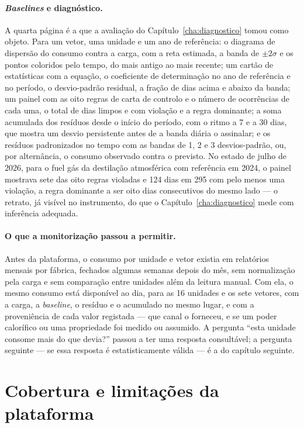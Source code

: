 \paragraph{\emph{Baselines} e diagnóstico.} A quarta página é a que a
avaliação do Capítulo~\ref{cha:diagnostico} tomou como objeto. Para um
vetor, uma unidade e um ano de referência: o diagrama de dispersão do
consumo contra a carga, com a reta estimada, a banda de $\pm2\sigma$ e os
pontos coloridos pelo tempo, do mais antigo ao mais recente; um cartão de
estatísticas com a equação, o coeficiente de determinação no ano de
referência e no período, o desvio-padrão residual, a fração de dias acima
e abaixo da banda; um painel com as oito regras de carta de controlo e o
número de ocorrências de cada uma, o total de dias limpos e com violação e
a regra dominante; a soma acumulada dos resíduos desde o início do
período, com o ritmo a 7 e a 30 dias, que mostra um desvio persistente
antes de a banda diária o assinalar; e os resíduos padronizados no tempo
com as bandas de 1, 2 e 3 desvios-padrão, ou, por alternância, o consumo
observado contra o previsto. No estado de julho de 2026, para o fuel gás
da destilação atmosférica com referência em 2024, o painel mostrava sete
das oito regras violadas e 124 dias em 295 com pelo menos uma violação, a
regra dominante a ser oito dias consecutivos do mesmo lado --- o retrato,
já visível no instrumento, do que o Capítulo~\ref{cha:diagnostico} mede
com inferência adequada.

\paragraph{O que a monitorização passou a permitir.} Antes da plataforma,
o consumo por unidade e vetor existia em relatórios mensais por fábrica,
fechados algumas semanas depois do mês, sem normalização pela carga e sem
comparação entre unidades além da leitura manual. Com ela, o mesmo consumo
está disponível ao dia, para as 16 unidades e os sete vetores, com a
carga, a \emph{baseline}, o resíduo e o acumulado no mesmo lugar, e com a
proveniência de cada valor registada --- que canal o forneceu, e se um
poder calorífico ou uma propriedade foi medido ou assumido. A pergunta
``esta unidade consome mais do que devia?'' passou a ter uma resposta
consultável; a pergunta seguinte --- se essa resposta é estatisticamente
válida --- é a do capítulo seguinte.

\section{Cobertura e limitações da plataforma}
\label{sec:cobertura}

